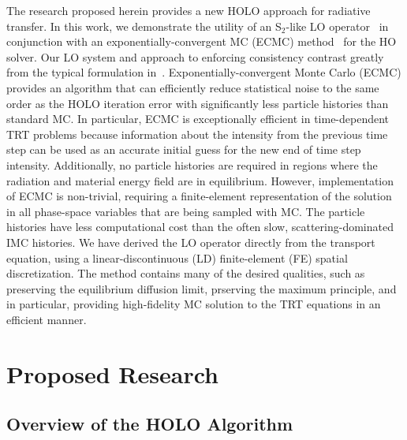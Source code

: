 \documentclass[11pt]{article}
\begin{document}
The research proposed herein provides a new HOLO approach for radiative transfer.
In this work, we demonstrate the utility of an S$_2$-like LO operator~\cite{wolters}
in conjunction with an exponentially-convergent MC (ECMC) method~\cite{jake} for the
HO solver. Our LO system and approach to enforcing consistency contrast greatly from the typical formulation
in~\cite{rmc,willert,park}.  
Exponentially-convergent Monte Carlo (ECMC)\cite{jake,ans_2014} provides an algorithm that can efficiently
reduce statistical noise to the same order as the HOLO iteration error with
significantly less particle histories than standard MC. In particular, ECMC is
exceptionally efficient in time-dependent TRT problems because information about the
intensity from the previous time step can be used as an accurate initial guess for
the new end of time step intensity. Additionally, no particle histories are required
in regions where the radiation and material energy field are in equilibrium.  However, implementation
of ECMC is non-trivial, requiring a finite-element representation of the solution in
all phase-space variables that are being sampled with MC.  The particle histories have less computational cost than the often slow, scattering-dominated
IMC histories.  We have derived the LO operator directly from the transport
equation, using a linear-discontinuous (LD) finite-element (FE) spatial
discretization.  The method contains many of the desired qualities, such as
preserving the equilibrium diffusion limit, prserving the maximum principle, and in
particular, providing high-fidelity MC solution to the TRT equations in an efficient
manner.




\section{Proposed Research}



\subsection{Overview of the HOLO Algorithm}
\end{document}

